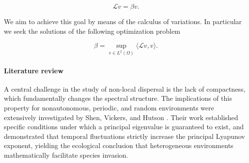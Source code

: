 \documentclass[11pt, a4paper]{article}
\theoremstyle{break}
\theoremstyle{break}
\theoremstyle{break}
\theoremstyle{break}
\theoremstyle{break}
\theoremstyle{break}
\theoremstyle{break}
\theoremstyle{break}
\theoremstyle{break}
\begin{document}
\begin{equation}
    \label{eq:nonlocal_eigenvalue_problem}
    \mathcal{L} v = \beta v.
\end{equation}

We aim to achieve this goal by means of the calculus of variations. In particular we seek the solutions of the following optimization problem

\begin{equation}
    \beta = \sup_{v \in L^2(\Omega)} \langle \mathcal{L} v, v\rangle.
\end{equation}

\paragraph{Literature review}

A central challenge in the study of non-local dispersal is the lack of compactness, which fundamentally changes the spectral structure. The implications of this property for nonautonomous, periodic, and random environments were extensively investigated by Shen, Vickers, and Hutson \cite{ShenVickers2007, HutsonShenVickers2008}. Their work established specific conditions under which a principal eigenvalue is guaranteed to exist, and demonstrated that temporal fluctuations strictly increase the principal Lyapunov exponent, yielding the ecological conclusion that heterogeneous environments mathematically facilitate species invasion.
\end{document}
